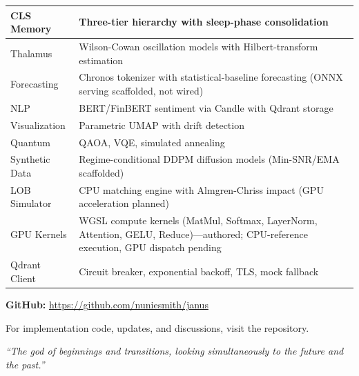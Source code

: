 \documentclass[12pt, a4paper]{article}
\begin{document}
\begin{table}[H]
\begin{tabularx}{\textwidth}{|l|L|}
		CLS Memory         & Three-tier hierarchy with sleep-phase consolidation                                                                     \\
		\hline
		Thalamus           & Wilson-Cowan oscillation models \citep{wilson1972excitatory, wilson2024bidirectional} with Hilbert-transform estimation \\
		\hline
		Forecasting        & Chronos tokenizer \citep{ansari2024chronos, ansari2024chronos2} with statistical-baseline forecasting (ONNX serving scaffolded, not wired)                                                \\
		\hline
		NLP                & BERT/FinBERT sentiment via Candle \citep{candle2024} with Qdrant storage                                                \\
		\hline
		Visualization      & Parametric UMAP \citep{mcinnes2018umap} with drift detection                                                            \\
		\hline
		Quantum            & QAOA, VQE, simulated annealing \citep{mugel2022dynamic}                                                                 \\
		\hline
		Synthetic Data     & Regime-conditional DDPM diffusion models \citep{coletta2024conditional} (Min-SNR/EMA scaffolded)                                                 \\
		\hline
		LOB Simulator      & CPU matching engine \citep{fu2024jaxlob} with Almgren-Chriss impact (GPU acceleration planned)                                         \\
		\hline
		GPU Kernels        & WGSL compute kernels (MatMul, Softmax, LayerNorm, Attention, GELU, Reduce)---authored; CPU-reference execution, GPU dispatch pending                                                       \\
		\hline
		Qdrant Client      & Circuit breaker, exponential backoff, TLS, mock fallback                                                                \\
		\hline
	\end{tabularx}
\end{table}

\vspace{1cm}

\begin{tcolorbox}[colback=janusblue!5, colframe=janusblue, title=\textbf{Repository \& Contact}]
	\centering
	\textbf{GitHub:} \url{https://github.com/nuniesmith/janus}

	\vspace{0.5cm}

	For implementation code, updates, and discussions, visit the repository.

	\vspace{0.5cm}

	\textit{``The god of beginnings and transitions, looking simultaneously to the future and the past.''} %
\end{tcolorbox}

\newpage


\begin{sloppypar}
	\printbibliography[title={References}]
\end{sloppypar}
\end{document}
